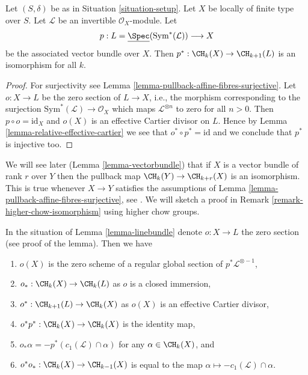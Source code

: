 \begin{lemma}
\label{lemma-linebundle}
Let $(S, \delta)$ be as in Situation \ref{situation-setup}.
Let $X$ be locally of finite type over $S$.
Let $\mathcal{L}$ be an invertible $\mathcal{O}_X$-module.
Let
$$
p :
L = \underline{\Spec}(\text{Sym}^*(\mathcal{L}))
\longrightarrow
X
$$
be the associated vector bundle over $X$.
Then $p^* : \CH_k(X) \to \CH_{k + 1}(L)$ is an isomorphism for all $k$.
\end{lemma}

\begin{proof}
For surjectivity see Lemma \ref{lemma-pullback-affine-fibres-surjective}.
Let $o : X \to L$ be the zero section of $L \to X$, i.e., the morphism
corresponding to the surjection $\text{Sym}^*(\mathcal{L}) \to \mathcal{O}_X$
which maps $\mathcal{L}^{\otimes n}$ to zero for all $n > 0$.
Then $p \circ o = \text{id}_X$ and $o(X)$ is an effective
Cartier divisor on $L$. Hence by Lemma \ref{lemma-relative-effective-cartier}
we see that $o^* \circ p^* = \text{id}$ and we conclude that $p^*$ is
injective too.
\end{proof}

\begin{remark}
\label{remark-when-isomorphism}
We will see later (Lemma \ref{lemma-vectorbundle}) that if $X$ is a
vector bundle of rank $r$ over $Y$ then the pullback map
$\CH_k(Y) \to \CH_{k + r}(X)$
is an isomorphism. This is true whenever $X \to Y$ satisfies
the assumptions of Lemma \ref{lemma-pullback-affine-fibres-surjective}, see
\cite[Lemma 2.2]{Totaro-group}. We will sketch a proof in
Remark \ref{remark-higher-chow-isomorphism} using higher chow groups.
\end{remark}

\begin{lemma}
\label{lemma-linebundle-formulae}
In the situation of Lemma \ref{lemma-linebundle} denote $o : X \to L$
the zero section (see proof of the lemma). Then we have
\begin{enumerate}
\item $o(X)$ is the zero scheme of a regular global section of
$p^*\mathcal{L}^{\otimes -1}$,
\item $o_* : \CH_k(X) \to \CH_k(L)$ as $o$ is a closed immersion,
\item $o^* : \CH_{k + 1}(L) \to \CH_k(X)$ as $o(X)$
is an effective Cartier divisor,
\item $o^* p^* : \CH_k(X) \to \CH_k(X)$ is the identity map,
\item $o_*\alpha = - p^*(c_1(\mathcal{L}) \cap \alpha)$ for any
$\alpha \in \CH_k(X)$, and
\item $o^* o_* : \CH_k(X) \to \CH_{k - 1}(X)$ is equal to the map
$\alpha \mapsto - c_1(\mathcal{L}) \cap \alpha$.
\end{enumerate}
\end{lemma}

